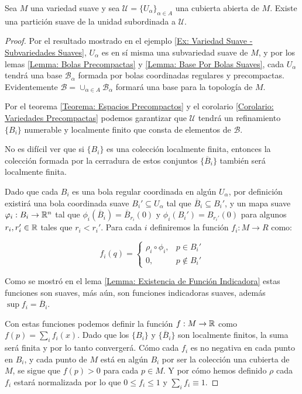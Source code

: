 \begin{theorem}\label{Teorema: Existencia de Particiones Suave de la Unidad}
	Sea $M$ una variedad suave y sea $\mathcal{U} = \{U_\alpha\}_{\alpha \in A}$ una cubierta abierta de $M$. Existe una partición suave de la unidad subordinada a $\mathcal{U}$.
\end{theorem}

\begin{proof}
	Por el resultado mostrado en el ejemplo \ref{Ex: Variedad Suave - Subvariedades Suaves}, $U_\alpha$ es en sí misma una subvariedad suave de $M$, y por los lemas \ref{Lemma: Bolas Precompactas} y \ref{Lemma: Base Por Bolas Suaves}, cada $U_\alpha$ tendrá una base $\mathcal{B}_\alpha$ formada por bolas coordinadas regulares y precompactas. Evidentemente $\mathcal{B} = \cup_{\alpha \in A} \mathcal{B}_\alpha$ formará una base para la topología de $M$.

	Por el teorema \ref{Teorema: Espacios Precompactos} y el corolario \ref{Corolario: Variedades Precompactas} podemos garantizar que $\mathcal{U}$ tendrá un refinamiento $\{B_i\}$ numerable y localmente finito que consta de elementos de $\mathcal{B}$.

	No es difícil ver que si $\{B_i\}$ es una colección localmente finita, entonces la colección formada por la cerradura de estos conjuntos $\{\overline{B}_i\}$ también será localmente finita.


	Dado que cada $B_i$ es una bola regular coordinada en algún $U_\alpha$, por definición existirá una bola coordinada suave $B_i' \subseteq U_\alpha$ tal que $\overline{B}_{i} \subseteq B_i'$, y un mapa suave $\varphi_i: B_i \to \mathbb{R}^n$ tal que $\phi_i(\overline{B}_i) = \overline{B}_{r_i}(0)$ y $\phi_i(B_i') = B_{r_i'}(0)$ para algunos $r_i, r_i' \in \mathbb{R}$ tales que $r_i < r_i'$. Para cada $i$ definiremos la función $f_i: M \to R$ como:

	\[
		f_i(q)= \begin{cases}
			\rho_i \circ \phi_i, & p \in B_i'    \\
			0,                   & p \notin B_i'
		\end{cases}
	\]

	Como se mostró en el lema \ref{Lemma: Existencia de Función Indicadora} estas funciones son suaves, más aún, son funciones indicadoras suaves, además $\sup f_i = \overline{B}_i$.

	Con estas funciones podemos definir la función $f: M \to \mathbb{R}$ como $f(p) = \sum_i f_i(x)$. Dado que los $\{B_i\}$ y $\{\overline{B}_i\}$ son localmente finitos, la suma será finita y por lo tanto convergerá. Cómo cada $f_i$ es no negativa en cada punto en $B_i$, y cada punto de $M$ está en algún $B_i$ por ser la colección una cubierta de $M$, se sigue que $f(p) > 0$ para cada $p \in M$. Y por cómo hemos definido $\rho$ cada $f_i$ estará normalizada por lo que $0 \leq f_i \leq 1$ y $\sum_i f_i \equiv 1$.


\end{proof}
